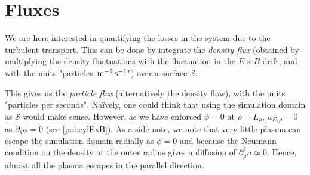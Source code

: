 \section{Fluxes}
\label{sec:fluxes}
%
We are here interested in quantifying the losses in the system due to the turbulent transport.
This can be done by integrate the \emph{density flux} (obtained by multiplying the density fluctuations with the fluctuation in the $E\times B$-drift, and with the units "particles $\, \text{m}^{-2}\, \text{s}^{-1}$") over a surface $\mathcal{S}$.

This gives us the \emph{particle flux} (alternatively the density flow), with the units "particles per seconds".
Na{\"i}vely, one could think that using the simulation domain as $\mathcal{S}$ would make sense.
However, as we have enforced $\phi=0$ at $\rho=L_\rho$, $u_{E,\rho}=0$ as $\partial_\theta \phi=0$ (see \cref{poi:cylExB}).
As a side note, we note that very little plasma can escape the simulation domain radially as $\phi=0$ and because the Neumann condition on the density at the outer radius gives a diffusion of $\partial_\rho^2 n \simeq 0$.
Hence, almost all the plasma escapes in the parallel direction.

